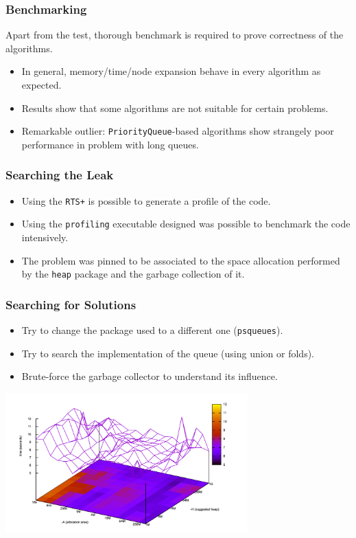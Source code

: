 \documentclass{beamer}
\begin{document}
\begin{frame}
  \frametitle{Benchmarking}
  Apart from the test, thorough benchmark is required to prove correctness of
  the algorithms.
  \begin{itemize}
  \item In general, memory/time/node expansion behave in every algorithm as
    expected.
  \item Results show that some algorithms are not suitable for certain
    problems.
  \item Remarkable outlier: \texttt{PriorityQueue}-based algorithms show
    strangely poor performance in problem with long queues.
  \end{itemize}
\end{frame}

\begin{frame}
  \frametitle{Searching the Leak}
  \begin{itemize}
  \item Using the \texttt{RTS+} is possible to generate a profile of the code.
  \item Using the \texttt{profiling} executable designed was possible to
    benchmark the code intensively.
  \item The problem was pinned to be associated to the space allocation
    performed by the \texttt{heap} package and the garbage collection of it.
  \end{itemize}
\end{frame}

\begin{frame}
  \frametitle{Searching for Solutions}
  \begin{itemize}
  \item Try to change the package used to a different one (\texttt{psqueues}).
  \item Try to search the implementation of the queue (using union or folds).
  \item Brute-force the garbage collector to understand its influence.
  \end{itemize}
  \centering
  \includegraphics[width=0.7\textwidth]{gc-tuning.png}
\end{frame}
\end{document}
